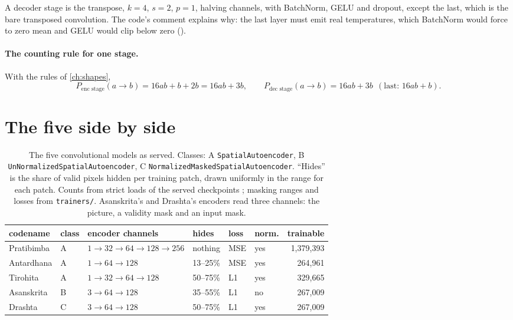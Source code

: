 A decoder stage is the transpose, $k=4$, $s=2$, $p=1$, halving channels, with BatchNorm, GELU and dropout, except
the last, which is the bare transposed convolution. The code's comment explains why: the last layer must emit real
temperatures, which BatchNorm would force to zero mean and GELU would clip below zero
().

\paragraph{The counting rule for one stage.} With the rules of \cref{ch:shapes},
\begin{equation}\label{eq:convae:stage}
P_\text{enc stage}(a\to b) = 16ab+b+2b = 16ab+3b, \qquad P_\text{dec stage}(a\to b) = 16ab+3b
\ \ (\text{last: } 16ab+b).
\end{equation}

\section{The five side by side}\label{sec:convae:table}

\begin{table}[htbp]
\centering\small
\begin{tabular}{@{}llllllr@{}}
\toprule
codename & class & encoder channels & hides & loss & norm. & trainable\\
\midrule
Pratibimba & A & $1\to32\to64\to128\to256$ & nothing & MSE & yes & 1,379,393\\
Antardhana & A & $1\to64\to128$ & 13--25\% & MSE & yes & 264,961\\
Tirohita & A & $1\to32\to64\to128$ & 50--75\% & L1 & yes & 329,665\\
Asanskrita & B & $3\to64\to128$ & 35--55\% & L1 & no & 267,009\\
Drashta & C & $3\to64\to128$ & 50--75\% & L1 & yes & 267,009\\
\bottomrule
\end{tabular}
\caption{The five convolutional models as served. Classes: A \texttt{SpatialAutoencoder}, B
\texttt{UnNormalizedSpatialAutoencoder}, C \texttt{NormalizedMaskedSpatialAutoencoder}. ``Hides'' is the share of valid
pixels hidden per training patch, drawn uniformly in the range for each patch. Counts from strict loads of the served checkpoints \tagC; masking ranges
and losses from \texttt{trainers/}. Asanskrita's and Drashta's encoders read three channels: the picture, a validity
mask and an input mask.}
\label{tab:convae:five}
\end{table}

